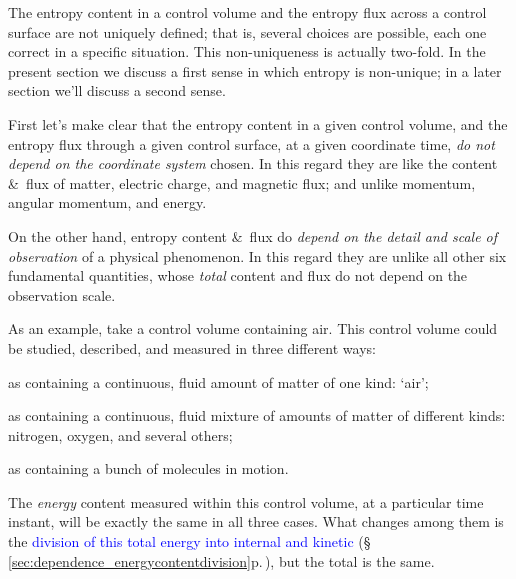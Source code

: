 \documentclass[a4paper,12pt,%
onecolumn,oneside,%
british%
]{memoir}
\newcommand*{\amp}{\&}
\renewcommand*{\|}[1][]{\nonscript\:#1\vert\nonscript\:\mathopen{}}
\newcommand*{\sect}{\S}%
\renewcommand*{\autoref}[3][\sect\,\ref]{\textcolor{blue}{#3} {\color{blue}\scriptsize(\faIcon[regular]{eye}\;#1{#2}\;p.\,\pageref{#2})}}
\begin{document}
The entropy content in a control volume and the entropy flux across a control surface are not uniquely defined; that is, several choices are possible, each one correct in a specific situation. This non-uniqueness is actually two-fold. In the present section we discuss a first sense in which entropy is non-unique; in a later section we'll discuss a second sense.

First let's make clear that the entropy content in a given control volume, and the entropy flux through a given control surface, at a given coordinate time, \emph{do not depend on the coordinate system} chosen. In this regard they are like the content \amp\ flux of matter, electric charge, and magnetic flux; and unlike momentum, angular momentum, and energy.

On the other hand, entropy content \amp\ flux do \emph{depend on the detail and scale of observation} of a physical phenomenon. In this regard they are unlike all other six fundamental quantities, whose \emph{total} content and flux do not depend on the observation scale.

As an example, %
take a control volume containing air. This control volume could be studied, described, and measured in three different ways:
\begin{enumerate*}[label=(\alph*)]
\item as containing a continuous, fluid amount of matter of one kind: \enquote*{air}; \item as containing a continuous, fluid mixture of amounts of matter of different kinds: nitrogen, oxygen, and several others; \item as containing a bunch of molecules in motion.
\end{enumerate*}

The \emph{energy} content measured within this control volume, at a particular time instant, will be exactly the same in all three cases. What changes among them is the \autoref{sec:dependence_energycontentdivision}{division of this total energy into internal and kinetic}, but the total is the same.
\end{document}
